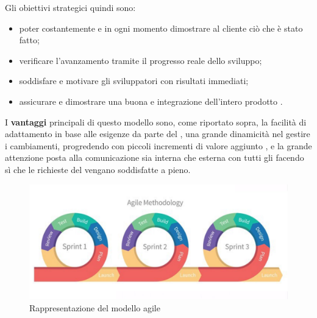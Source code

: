 Gli obiettivi strategici quindi sono:
\begin{itemize}
    \item poter costantemente e in ogni momento dimostrare al cliente ciò che è stato fatto;
    \item verificare l’avanzamento tramite il progresso reale dello sviluppo;
    \item soddisfare e motivare gli sviluppatori con risultati immediati;
    \item assicurare e dimostrare una buona  e integrazione dell’intero prodotto .
\end{itemize}
I \textbf{vantaggi} principali di questo modello sono, come riportato sopra, la facilità di adattamento in base alle esigenze da parte del , 
una grande dinamicità nel gestire i cambiamenti, progredendo con piccoli incrementi di valore aggiunto ,
e la grande attenzione posta alla comunicazione sia interna che esterna con tutti gli  facendo sì che le richieste del \proponente{} vengano soddisfatte a pieno.

\begin{figure}[H]
    \centering
    \includegraphics[scale = 0.25]{components/img/agile.png}
    \caption{Rappresentazione del modello agile}
    \label{fig:Rappresentazione del modello agile}
\end{figure}


